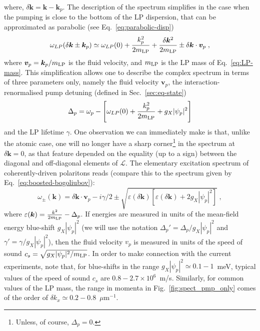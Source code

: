 %
where, $\delta \bm{k} = \bm{k} - \bm{k}_p$. The description of the
spectrum simplifies in the case when the pumping is close to the
bottom of the LP dispersion, that can be approximated as parabolic
(see Eq.~\eqref{eq:parabolic-disp})
%
\begin{equation}
  \omega_{LP} (\delta \bm{k} \pm \bm{k}_p) \simeq \omega_{LP}(0) +
  \frac{k_p^2}{2m_{\text{LP}}} + \frac{\delta \bm{k}^2}{2m_{\text{LP}}} \pm \delta \bm{k}
  \cdot \bm{v}_p \; ,
\end{equation}
%
where $\bm{v}_p=\bm{k}_p/m_{\text{LP}}$ is the fluid velocity, and
$m_{\text{LP}}$ is the LP mass of Eq.~\eqref{eq:LP-mass}. This
simplification allows one to describe the complex spectrum in terms of
three parameters only, namely the fluid velocity $\bm{v}_p$, the
interaction-renormalised pump detuning (defined in
Sec.~\ref{sec:eq-state})
%
\begin{equation}
  \Delta_p = \omega_p - \left[\omega_{LP} (0) +\frac{k_p^2}{2m_{\text{LP}}} +
    g_X|\psi_p|^2\right]
\end{equation}
%
and the LP lifetime $\gamma$. One observation we can immediately make
is that, unlike the atomic case, one will no longer have a sharp
corner\footnote{Unless, of course, $\Delta_p = 0$.}  in the spectrum
at $\delta \bm{k} = 0$, as that feature depended on the equality (up
to a sign) between the diagonal and off-diagonal elements of
$\mathcal{L}$.
%
The elementary excitation spectrum of coherently-driven polaritons
reads (compare this to the spectrum given by
Eq.~\eqref{eq:boosted-bogoliubov}):
%
\begin{equation}
  \omega_{\pm} (\bm{k}) = \delta \bm{k}\cdot \bm{v}_p - i\gamma/2
  \pm \sqrt{\varepsilon(\delta \bm{k}) \left[\varepsilon(\delta
      \bm{k}) + 2g_X|\psi_p|^2\right]} \; ,
\label{eq:spect}
\end{equation}
%
where $\varepsilon(\bm{k}) = \frac{k^2}{2m_{\text{LP}}} - \Delta_p$. If energies
are measured in units of the mean-field energy blue-shift $g_X
|\psi_p|^2$ (we will use the notation $\Delta_p' =
\Delta_p/g_X|\psi_p|^2$ and $\gamma'= \gamma/g_X|\psi_p|^2$), then the
fluid velocity $v_p$ is measured in units of the speed of sound $c_s =
\sqrt{g_X|\psi_p|^2/m_{\text{LP}}}$. In order to make connection with the current
experiments, note that, for blue-shifts in the range $g_X |\psi_p|^2
\simeq 0.1-1$~meV, typical values of the speed of sound $c_s$ are
$0.8-2.7\times 10^6$~m/s. Similarly, for common values of the LP mass,
the range in momenta in Fig.~\ref{fig:spect_pmp_only} comes of the order of
$\delta k_x \simeq 0.2-0.8$~$\mu$m${}^{-1}$.

